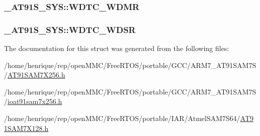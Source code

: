 \hypertarget{struct__AT91S__SYS_a81ab17c1d918b34a6d8d4698d55141a6}{
\subsubsection[{W\-D\-T\-C\-\_\-\-W\-D\-M\-R}]{ \-\_\-\-A\-T91\-S\-\_\-\-S\-Y\-S\-::\-W\-D\-T\-C\-\_\-\-W\-D\-M\-R}}\label{struct__AT91S__SYS_a81ab17c1d918b34a6d8d4698d55141a6}
\hypertarget{struct__AT91S__SYS_afaa66f92cf1aa8b7c47de4f0f9db14e9}{
\subsubsection[{W\-D\-T\-C\-\_\-\-W\-D\-S\-R}]{ \-\_\-\-A\-T91\-S\-\_\-\-S\-Y\-S\-::\-W\-D\-T\-C\-\_\-\-W\-D\-S\-R}}\label{struct__AT91S__SYS_afaa66f92cf1aa8b7c47de4f0f9db14e9}


The documentation for this struct was generated from the following files\-:\begin{DoxyCompactItemize}
\item 
/home/henrique/rep/open\-M\-M\-C/\-Free\-R\-T\-O\-S/portable/\-G\-C\-C/\-A\-R\-M7\-\_\-\-A\-T91\-S\-A\-M7\-S/\hyperlink{GCC_2ARM7__AT91SAM7S_2AT91SAM7X256_8h}{A\-T91\-S\-A\-M7\-X256.\-h}\item 
/home/henrique/rep/open\-M\-M\-C/\-Free\-R\-T\-O\-S/portable/\-G\-C\-C/\-A\-R\-M7\-\_\-\-A\-T91\-S\-A\-M7\-S/\hyperlink{ioat91sam7x256_8h}{ioat91sam7x256.\-h}\item 
/home/henrique/rep/open\-M\-M\-C/\-Free\-R\-T\-O\-S/portable/\-I\-A\-R/\-Atmel\-S\-A\-M7\-S64/\hyperlink{AT91SAM7X128_8h}{A\-T91\-S\-A\-M7\-X128.\-h}\end{DoxyCompactItemize}
